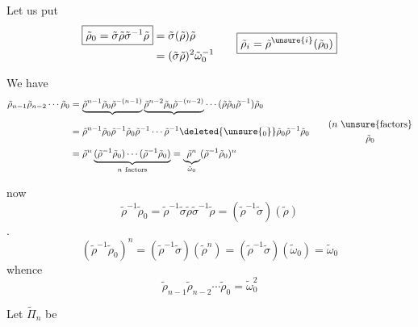 Let us put
\[
\begin{aligned}
\boxed{\tilde\rho_0=\tilde\sigma\tilde\rho\tilde\sigma^{-1}\tilde\rho}
&=\tilde\sigma(\tilde\rho)\tilde\rho\\
&=(\tilde\sigma\tilde\rho)^2\tilde\omega_0^{-1}
\end{aligned}
\qquad
\boxed{\tilde\rho_i=\tilde\rho^{\unsure{i}}(\tilde\rho_0)}
\]

We have
\[
\begin{aligned}
\tilde\rho_{n-1}\tilde\rho_{n-2}\cdots\tilde\rho_0
&=\underbrace{\tilde\rho^{n-1}\tilde\rho_0\tilde\rho^{-(n-1)}}
\underbrace{\tilde\rho^{n-2}\tilde\rho_0\tilde\rho^{-(n-2)}}
\cdots(\tilde\rho\tilde\rho_0\tilde\rho^{-1})\tilde\rho_0\\
&=\tilde\rho^{n-1}\tilde\rho_0\tilde\rho^{-1}\tilde\rho_0\tilde\rho^{-1}
\cdots\tilde\rho^{-1}\deleted{\unsure{{}_0}}\tilde\rho_0\tilde\rho^{-1}\tilde\rho_0
\qquad\begin{gathered}(n\ \text{\unsure{factors}}\\\tilde\rho_0\end{gathered}\\
&=\tilde\rho^n\underbrace{(\tilde\rho^{-1}\tilde\rho_0)\cdots(\tilde\rho^{-1}\tilde\rho_0)}_{n\ \text{factors}}
=\underbrace{\tilde\rho^n}_{\tilde\omega_0}(\tilde\rho^{-1}\tilde\rho_0)^n
\end{aligned}
\]

now
\[
\tilde\rho^{-1}\tilde\rho_0
=\tilde\rho^{-1}\tilde\sigma\tilde\rho\tilde\sigma^{-1}\tilde\rho
=(\tilde\rho^{-1}\tilde\sigma)(\tilde\rho)
\]
. 
\[
(\tilde\rho^{-1}\tilde\rho_0)^n
=(\tilde\rho^{-1}\tilde\sigma)(\tilde\rho^n)
=(\tilde\rho^{-1}\tilde\sigma)(\tilde\omega_0)
=\tilde\omega_0
\]
whence
\[
\boxed{\tilde\rho_{n-1}\tilde\rho_{n-2}\cdots\tilde\rho_0=\tilde\omega_0^2}
\]

Let $\widetilde\Pi_n$ be


